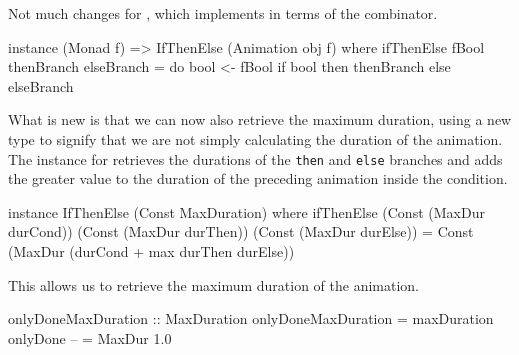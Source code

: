 Not much changes for , which implements  in terms of
the \hs{>>=} combinator. 

\begin{code}
instance (Monad f) => IfThenElse (Animation obj f) where
  ifThenElse fBool thenBranch elseBranch = do
    bool <- fBool
    if bool then thenBranch else elseBranch
\end{code}

What is new is that we can now also retrieve the maximum duration, using a new type
 to signify that we are not simply calculating the duration of
the animation. The instance for  retrieves the
durations of the \texttt{then} and \texttt{else} branches and adds the greater
value to the duration of the preceding animation inside the condition.

\begin{code}
instance IfThenElse (Const MaxDuration) where
  ifThenElse (Const (MaxDur durCond)) (Const (MaxDur durThen))
             (Const (MaxDur durElse)) =
    Const (MaxDur (durCond + max durThen durElse))
\end{code}

This allows us to retrieve the maximum duration of the  animation.

\begin{spec}
onlyDoneMaxDuration :: MaxDuration
onlyDoneMaxDuration = maxDuration onlyDone -- = MaxDur 1.0
\end{spec}
